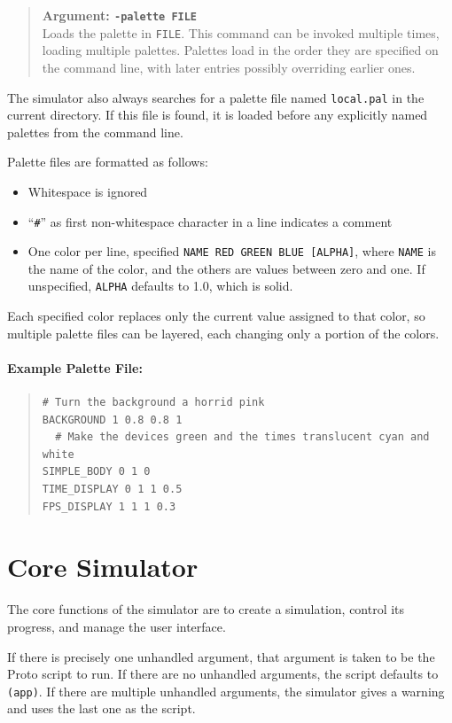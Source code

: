 \documentclass{article}
\newcommand\var[1]{{\tt #1}}
\newcommand\simarg[2]{\begin{quote} {\bf Argument: \var{#1}} \\ #2 \end{quote}}
\begin{document}
\simarg{-palette FILE}{Loads the palette in \var{FILE}.  This
command can be invoked multiple times, loading multiple palettes.
Palettes load in the order they are specified on the command line,
with later entries possibly overriding earlier ones.}

The simulator also always searches for a palette file named
\var{local.pal} in the current directory.  If this file is found, it
is loaded before any explicitly named palettes from the command line.

Palette files are formatted as follows:
\begin{itemize}
\item Whitespace is ignored
\item ``\var{\#}'' as first non-whitespace character in a line indicates a comment
\item One color per line, specified \var{NAME RED GREEN BLUE [ALPHA]},
      where \var{NAME} is the name of the color, and the others are
      values between zero and one.  If unspecified, \var{ALPHA} defaults
      to 1.0, which is solid.
\end{itemize}
Each specified color replaces only the current value assigned to that
color, so multiple palette files can be layered, each changing only a
portion of the colors.

\paragraph{Example Palette File:}
\begin{quote}
\begin{verbatim}
# Turn the background a horrid pink
BACKGROUND 1 0.8 0.8 1  
  # Make the devices green and the times translucent cyan and white
SIMPLE_BODY 0 1 0  
TIME_DISPLAY 0 1 1 0.5
FPS_DISPLAY 1 1 1 0.3
\end{verbatim}
\end{quote}


\section{Core Simulator}

The core functions of the simulator are to create a simulation,
control its progress, and manage the user interface.

If there is precisely one unhandled argument, that argument is taken
to be the Proto script to run.  If there are no unhandled
arguments, the script defaults to \var{(app)}.  If there are multiple
unhandled arguments, the simulator gives a warning and uses the last
one as the script.
\end{document}
